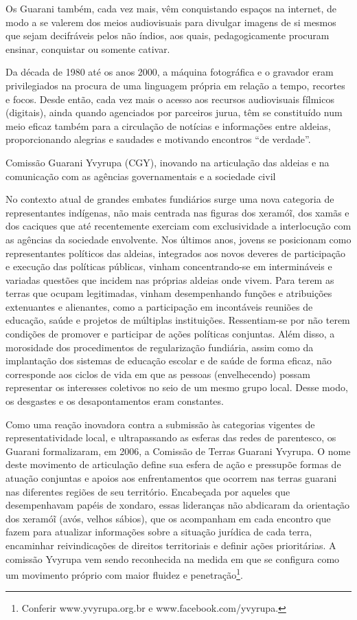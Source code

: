 Os Guarani também, cada vez mais, vêm conquistando espaços na internet,
de modo a se valerem dos meios audiovisuais para divulgar imagens de si
mesmos que sejam decifráveis pelos não índios, aos quais,
pedagogicamente procuram ensinar, conquistar ou somente cativar. 

Da década de 1980 até os anos 2000, a máquina fotográfica e o gravador
eram privilegiados na procura de uma linguagem própria em relação a
tempo, recortes e focos. Desde então, cada vez mais o acesso aos
recursos audiovisuais fílmicos (digitais), ainda quando agenciados por
parceiros jurua, têm se constituído num meio eficaz também para a
circulação de notícias e informações entre aldeias, proporcionando
alegrias e saudades e motivando encontros ``de verdade''.

Comissão Guarani Yvyrupa (CGY), inovando na articulação das aldeias e na
comunicação com as agências governamentais e a sociedade civil

No contexto atual de grandes embates fundiários surge uma nova categoria
de representantes indígenas, não mais centrada nas figuras dos
xeramóĩ, dos xamãs e dos caciques que até
recentemente exerciam com exclusividade a interlocução com as agências
da sociedade envolvente. Nos últimos anos, jovens se posicionam como
representantes políticos das aldeias, integrados aos novos deveres de
participação e execução das políticas públicas, vinham concentrando-se
em intermináveis e variadas questões que incidem nas próprias aldeias
onde vivem. Para terem as terras que ocupam legitimadas, vinham
desempenhando funções e atribuições extenuantes e alienantes, como a
participação em incontáveis reuniões de educação, saúde e projetos de
múltiplas instituições. Ressentiam-se por não terem condições de
promover e participar de ações políticas conjuntas. Além disso, a
morosidade dos procedimentos de regularização fundiária, assim como da
implantação dos sistemas de educação escolar e de saúde de forma
eficaz, não corresponde aos ciclos de vida em que as pessoas
(envelhecendo) possam representar os interesses coletivos no seio de um
mesmo grupo local. Desse modo, os desgastes e os desapontamentos eram
constantes.  

Como uma reação inovadora contra a submissão às categorias vigentes de
representatividade local, e ultrapassando as esferas das redes de
parentesco, os Guarani formalizaram, em 2006, a Comissão de Terras
Guarani Yvyrupa.  O nome deste movimento de articulação define sua
esfera de ação e pressupõe formas de atuação conjuntas e apoios aos
enfrentamentos que ocorrem nas terras guarani nas diferentes regiões de
seu território. Encabeçada por aqueles que desempenhavam papéis de
xondaro, essas lideranças não abdicaram da orientação dos
xeramóĩ (avós, velhos sábios), que os acompanham
em cada encontro que fazem para atualizar informações sobre a situação
jurídica de cada terra, encaminhar reivindicações de direitos
territoriais e definir ações prioritárias. A comissão Yvyrupa vem sendo
reconhecida na medida em que se configura como um movimento próprio com
maior fluidez e penetração\footnote{Conferir www.yvyrupa.org.br e
www.facebook.com/yvyrupa.}. 

